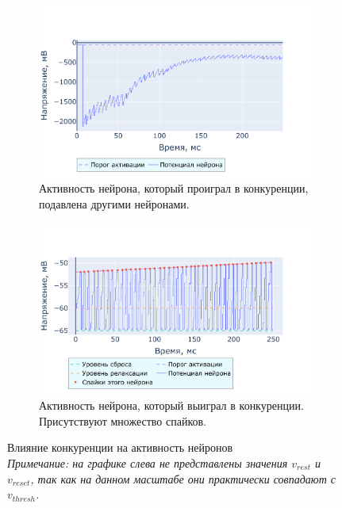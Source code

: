 \documentclass[a4paper]{article}
\begin{document}
\begin{figure}[H]
\centering
\begin{subfigure}{0.95\textwidth}
    \includegraphics[width=\textwidth,keepaspectratio=true]{bad_voltage_ru.pdf}
    \caption{Активность нейрона, который проиграл в конкуренции, подавлена другими нейронами.
    } 
\end{subfigure}
\begin{subfigure}{0.95\textwidth}
    \includegraphics[width=\textwidth,keepaspectratio=true]{good_voltage_ru.pdf}
    \caption{Активность нейрона, который выиграл в конкуренции. Присутствуют множество спайков.}
\end{subfigure}
\caption{Влияние конкуренции на активность нейронов\\
\textit{Примечание: на графике слева не представлены значения $v_{rest}$ и $v_{reset}$, так как на данном масштабе они практически совпадают с $v_{thresh}$.}}
\label{competition-training-importance}  
\end{figure} 
\end{document}
